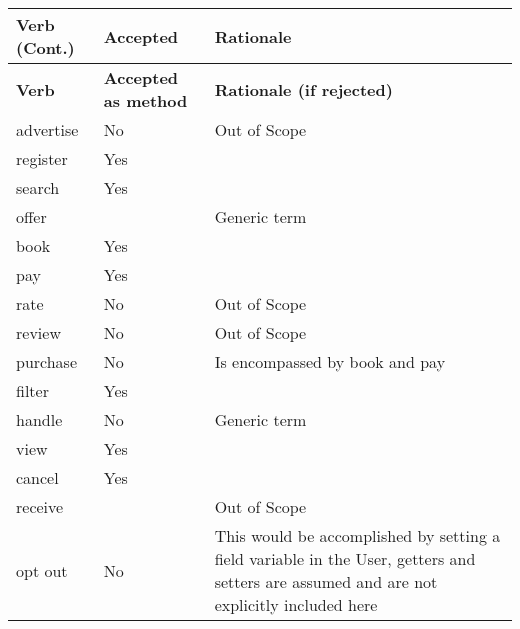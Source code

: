 \renewcommand*{\arraystretch}{1.3}
\begin{longtable}{m{2.5cm} >{\centering\arraybackslash}m{2cm} m{6cm}}
	\toprule
	\textbf{Verb (Cont.)} & \textbf{Accepted} & \textbf{Rationale} \\
	\endhead
	\toprule
	\textbf{Verb} & \textbf{Accepted as method} & \textbf{Rationale (if rejected)} \\
	\endfirsthead
	\midrule
	advertise & No & Out of Scope \\
	\midrule
	register & Yes &  \\
	\midrule
	search & Yes &  \\
	\midrule
	offer &  & Generic term \\
	\midrule
	book & Yes &  \\
	\midrule
	pay & Yes &  \\
	\midrule
	rate & No & Out of Scope \\
	\midrule
	review & No & Out of Scope \\
	\midrule
	purchase & No & Is encompassed by book and pay \\
	\midrule
	filter & Yes &  \\
	\midrule
	handle & No & Generic term \\
	\midrule
	view & Yes &  \\
	\midrule
	cancel & Yes &  \\
	\midrule
	receive &  & Out of Scope \\
	\midrule
	opt out & No & This would be accomplished by setting a field variable in
	the User, getters and setters are assumed and are not explicitly
	included here \\
	\bottomrule
\end{longtable}
